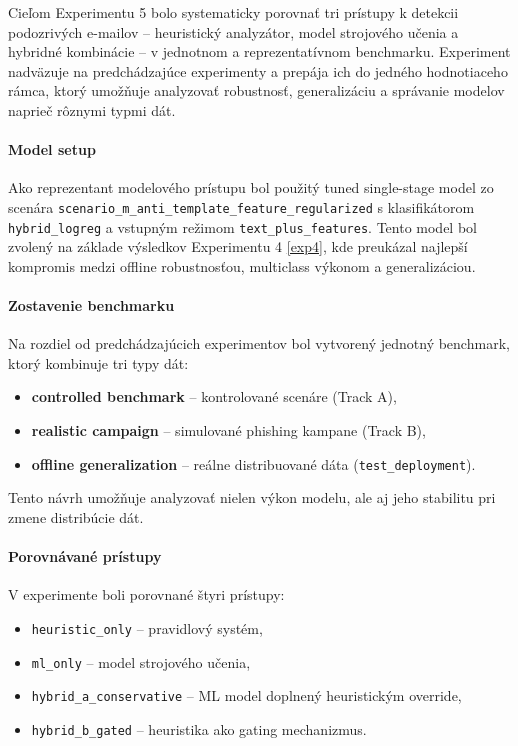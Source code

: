 \documentclass[conference]{IEEEtran}
\begin{document}
Cieľom Experimentu 5 bolo systematicky porovnať tri prístupy k detekcii podozrivých e-mailov
– heuristický analyzátor, model strojového učenia a hybridné kombinácie – v jednotnom
a reprezentatívnom benchmarku. Experiment nadväzuje na predchádzajúce experimenty a
prepája ich do jedného hodnotiaceho rámca, ktorý umožňuje analyzovať robustnosť,
generalizáciu a správanie modelov naprieč rôznymi typmi dát.

\paragraph{Model setup}

Ako reprezentant modelového prístupu bol použitý tuned single-stage model zo scenára
\texttt{scenario\_m\_anti\_template\_feature\_regularized} s klasifikátorom
\texttt{hybrid\_logreg} a vstupným režimom \texttt{text\_plus\_features}.
Tento model bol zvolený na základe výsledkov Experimentu 4 \ref{exp4}, kde preukázal
najlepší kompromis medzi offline robustnosťou, multiclass výkonom a generalizáciou.

\paragraph{Zostavenie benchmarku}

Na rozdiel od predchádzajúcich experimentov bol vytvorený jednotný benchmark,
ktorý kombinuje tri typy dát:

\begin{itemize}
    \item \textbf{controlled benchmark} – kontrolované scenáre (Track A),
    \item \textbf{realistic campaign} – simulované phishing kampane (Track B),
    \item \textbf{offline generalization} – reálne distribuované dáta (\texttt{test\_deployment}).
\end{itemize}

Tento návrh umožňuje analyzovať nielen výkon modelu,
ale aj jeho stabilitu pri zmene distribúcie dát.

\paragraph{Porovnávané prístupy}

V experimente boli porovnané štyri prístupy:

\begin{itemize}
    \item \texttt{heuristic\_only} – pravidlový systém,
    \item \texttt{ml\_only} – model strojového učenia,
    \item \texttt{hybrid\_a\_conservative} – ML model doplnený heuristickým override,
    \item \texttt{hybrid\_b\_gated} – heuristika ako gating mechanizmus.
\end{itemize}
\end{document}
